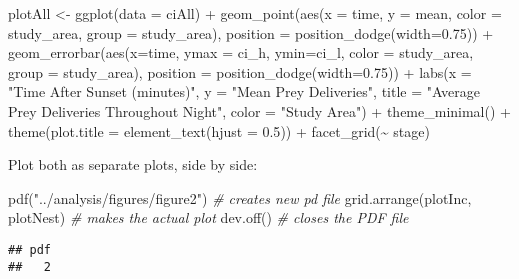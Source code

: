 \documentclass[
]{article}
\newenvironment{Shaded}{\begin{snugshade}}{\end{snugshade}}
\newcommand{\AttributeTok}[1]{\textcolor[rgb]{0.77,0.63,0.00}{#1}}
\newcommand{\CommentTok}[1]{\textcolor[rgb]{0.56,0.35,0.01}{\textit{#1}}}
\newcommand{\FloatTok}[1]{\textcolor[rgb]{0.00,0.00,0.81}{#1}}
\newcommand{\FunctionTok}[1]{\textcolor[rgb]{0.00,0.00,0.00}{#1}}
\newcommand{\NormalTok}[1]{#1}
\newcommand{\OtherTok}[1]{\textcolor[rgb]{0.56,0.35,0.01}{#1}}
\newcommand{\SpecialCharTok}[1]{\textcolor[rgb]{0.00,0.00,0.00}{#1}}
\newcommand{\StringTok}[1]{\textcolor[rgb]{0.31,0.60,0.02}{#1}}
\begin{document}
\begin{Shaded}
\begin{Highlighting}[]
\NormalTok{plotAll }\OtherTok{\textless{}{-}} \FunctionTok{ggplot}\NormalTok{(}\AttributeTok{data =}\NormalTok{ ciAll) }\SpecialCharTok{+}
  \FunctionTok{geom\_point}\NormalTok{(}\FunctionTok{aes}\NormalTok{(}\AttributeTok{x =}\NormalTok{ time, }\AttributeTok{y =}\NormalTok{ mean, }\AttributeTok{color =}\NormalTok{ study\_area, }\AttributeTok{group =}\NormalTok{ study\_area),}
             \AttributeTok{position =} \FunctionTok{position\_dodge}\NormalTok{(}\AttributeTok{width=}\FloatTok{0.75}\NormalTok{)) }\SpecialCharTok{+}
  \FunctionTok{geom\_errorbar}\NormalTok{(}\FunctionTok{aes}\NormalTok{(}\AttributeTok{x=}\NormalTok{time, }\AttributeTok{ymax =}\NormalTok{ ci\_h, }\AttributeTok{ymin=}\NormalTok{ci\_l, }\AttributeTok{color =}\NormalTok{ study\_area, }
                    \AttributeTok{group =}\NormalTok{ study\_area),}
                \AttributeTok{position =} \FunctionTok{position\_dodge}\NormalTok{(}\AttributeTok{width=}\FloatTok{0.75}\NormalTok{)) }\SpecialCharTok{+}
  \FunctionTok{labs}\NormalTok{(}\AttributeTok{x =} \StringTok{"Time After Sunset (minutes)"}\NormalTok{, }\AttributeTok{y =} \StringTok{"Mean Prey Deliveries"}\NormalTok{, }
       \AttributeTok{title =} \StringTok{"Average Prey Deliveries Throughout Night"}\NormalTok{, }\AttributeTok{color =} \StringTok{"Study Area"}\NormalTok{) }\SpecialCharTok{+}
  \FunctionTok{theme\_minimal}\NormalTok{() }\SpecialCharTok{+}
  \FunctionTok{theme}\NormalTok{(}\AttributeTok{plot.title =} \FunctionTok{element\_text}\NormalTok{(}\AttributeTok{hjust =} \FloatTok{0.5}\NormalTok{)) }\SpecialCharTok{+}
  \FunctionTok{facet\_grid}\NormalTok{(}\SpecialCharTok{\textasciitilde{}}\NormalTok{ stage)}
\end{Highlighting}
\end{Shaded}

Plot both as separate plots, side by side:

\begin{Shaded}
\begin{Highlighting}[]
\FunctionTok{pdf}\NormalTok{(}\StringTok{"../analysis/figures/figure2"}\NormalTok{)    }\CommentTok{\# creates new pd file}
\FunctionTok{grid.arrange}\NormalTok{(plotInc, plotNest) }\CommentTok{\# makes the actual plot}
\FunctionTok{dev.off}\NormalTok{()     }\CommentTok{\# closes the PDF file}
\end{Highlighting}
\end{Shaded}

\begin{verbatim}
## pdf 
##   2
\end{verbatim}
\end{document}
